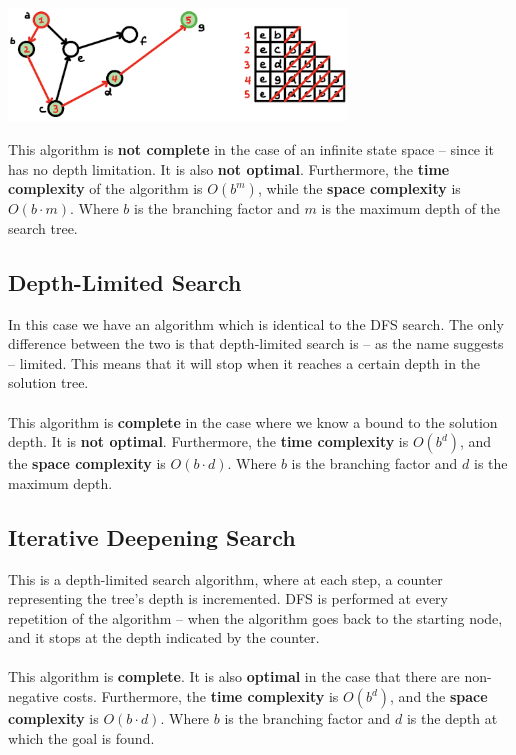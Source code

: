 \documentclass{article}
\begin{document}
\begin{center}
	\includegraphics[width=9cm]{dfs.png}
\end{center}
\vspace{.3cm}
This algorithm is \textbf{not complete} in the case of an infinite state space -- since it has no depth limitation. It is also \textbf{not optimal}. Furthermore, the \textbf{time complexity} of the algorithm is $O(b^m)$, while the \textbf{space complexity} is $O(b \cdot m)$. Where $b$ is the branching factor and $m$ is the maximum depth of the search tree.

\subsection{Depth-Limited Search}
In this case we have an algorithm which is identical to the DFS search. The only difference between the two is that depth-limited search is -- as the name suggests -- limited. This means that it will stop when it reaches a certain depth in the solution tree. \\ \\
This algorithm is \textbf{complete} in the case where we know a bound to the solution depth. It is \textbf{not optimal}. Furthermore, the \textbf{time complexity} is $O(b^d)$, and the \textbf{space complexity} is $O(b \cdot d)$. Where $b$ is the branching factor and $d$ is the maximum depth.

\subsection{Iterative Deepening Search}
This is a depth-limited search algorithm, where at each step, a counter representing the tree's depth is incremented. DFS is performed at every repetition of the algorithm -- when the algorithm goes back to the starting node, and it stops at the depth indicated by the counter. \\ \\
This algorithm is \textbf{complete}. It is also \textbf{optimal} in the case that there are non-negative costs. Furthermore, the \textbf{time complexity} is $O(b^d)$, and the \textbf{space complexity} is $O(b \cdot d)$. Where $b$ is the branching factor and $d$ is the depth at which the goal is found.
\end{document}
